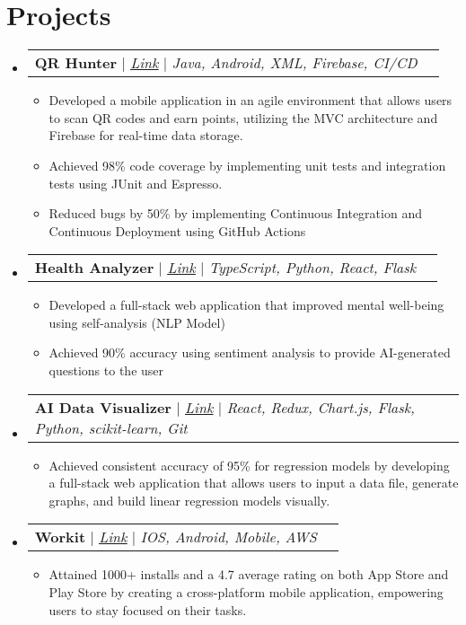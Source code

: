 \documentclass[letterpaper,11pt]{article}
\makeatletter
\newcommand{\resumeItem}[1]{
  \item\small{
    {#1 \vspace{-2pt}}
  }
}
\newcommand{\resumeProjectHeading}[2]{
    \item
    \begin{tabular*}{0.97\textwidth}{l@{\extracolsep{\fill}}r}
      \small#1 & #2 \\
    \end{tabular*}\vspace{-7pt}
}
\newcommand{\resumeSubHeadingListStart}{\begin{itemize}[leftmargin=0.15in, label={}]}
\newcommand{\resumeSubHeadingListEnd}{\end{itemize}}
\newcommand{\resumeItemListStart}{\begin{itemize}}
\newcommand{\resumeItemListEnd}{\end{itemize}\vspace{-5pt}}
\makeatother
\begin{document}
\section{Projects}
    \resumeSubHeadingListStart
      \resumeProjectHeading
      {\textbf{QR Hunter} $|$ \href{https://github.com/CMPUT301W23T32/lordofthewings}{\underline{\emph{Link}}} $|$ \emph{Java, Android, XML, Firebase, CI/CD}}{}
      \resumeItemListStart
        \resumeItem{Developed a mobile application in an agile environment that allows users to scan QR codes and earn points, utilizing the MVC architecture and Firebase for real-time data storage.}
        \resumeItem{Achieved 98\% code coverage by implementing unit tests and integration tests using JUnit and Espresso.}
        \resumeItem{Reduced bugs by 50\% by implementing Continuous Integration and Continuous Deployment using GitHub Actions}
      \resumeItemListEnd
      \resumeProjectHeading
      {\textbf{Health Analyzer} $|$  \href{https://github.com/mansooranis/ram-hackedbeta}{\underline{\emph{Link}}} $|$ \emph{TypeScript, Python, React, Flask}}{}
      \resumeItemListStart
        \resumeItem{Developed a full-stack web application that improved mental well-being using self-analysis (NLP Model)}
        \resumeItem{Achieved 90\% accuracy using sentiment analysis to provide AI-generated questions to the user}
      \resumeItemListEnd
      \resumeProjectHeading
      {\textbf{AI Data Visualizer} $|$ \href{https://github.com/mansooranis/AI-Visualizer}{\underline{\emph{Link}}} $|$ \emph{React, Redux, Chart.js, Flask, Python, scikit-learn, Git}}{}
      \resumeItemListStart
        \resumeItem{Achieved consistent accuracy of 95\% for regression models by developing a full-stack web application that allows users to input a data file, generate graphs, and build linear regression models visually.}
      \resumeItemListEnd
      \resumeProjectHeading
          {\textbf{Workit} $|$ \href{https://play.google.com/store/apps/details?id=com.mansooranis.oceanfocused}{\underline{\emph{Link}}} $|$ \emph{IOS, Android, Mobile, AWS}}{}
          \resumeItemListStart
            \resumeItem{Attained 1000+ installs and a 4.7 average rating on both App Store and Play Store by creating a cross-platform mobile application, empowering users to stay focused on their tasks.}
          \resumeItemListEnd
    \resumeSubHeadingListEnd
\end{document}
